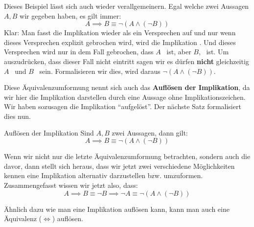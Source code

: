 \documentclass[../../main.tex]{subfiles}
\begin{document}
    Dieses Beispiel lässt sich auch wieder verallgemeinern. Egal welche zwei Aussagen $A,B$ wir 
    gegeben haben, es gilt immer:
    \[A \implies B \equiv \lnot (A \land (\lnot B))\] 
    Klar: Man fasst die Implikation wieder als 
    ein Versprechen auf und nur wenn dieses Versprechen explizit gebrochen wird,
     wird die Implikation \falsch. Und dieses Versprechen wird nur in dem Fall 
     gebrochen, dass $A$ \wahr\ ist, aber $B$, \falsch\  ist. Um auszudrücken, 
     dass dieser Fall nicht eintritt sagen wir es dürfen \textbf{nicht} gleichzeitig 
     $A$ \wahr\ und $B$ \falsch\ sein. Formalisieren wir dies, wird daraus 
     $\lnot (A \land (\lnot B))$.
    
    Diese Äquivalenzumformung nennt sich auch das \textbf{Auflösen der Implikation}, da wir hier die Implikation darstellen durch eine Aussage ohne Implikationszeichen. Wir haben sozusagen die Implikation \enquote{aufgelöst}. Der nächste Satz formalisiert dies nun.
    
    \begin{theorem}{Auflösen der Implikation}
        Sind $A,B$ zwei Aussagen, dann gilt:
        \[A \implies B \equiv \lnot (A \land (\lnot B))\]
    \end{theorem}
    
    Wenn wir nicht nur die letzte Äquivalenzumformung betrachten, sondern auch die davor, 
    dann stellt sich heraus, 
    dass wir jetzt zwei verschiedene Möglichkeiten kennen eine Implikation alternativ 
    darzustellen bzw. umzuformen. Zusammengefasst wissen wir jetzt also, dass:
     \[A \implies B \equiv \lnot B \implies \lnot A \equiv \lnot (A \land (\lnot B))\]
    
    Ähnlich dazu wie man eine Implikation auflösen kann, 
    kann man auch eine Äquivalenz ($\iff$) auflösen.
\end{document}
